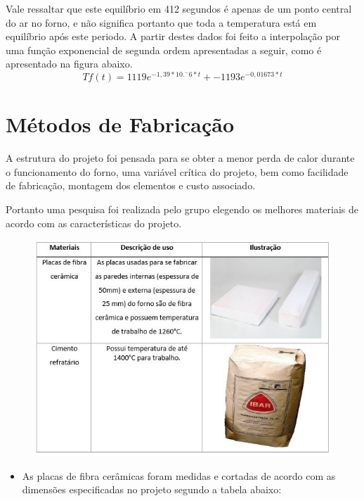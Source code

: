 Vale ressaltar que este equilíbrio em 412 segundos é apenas de um ponto central do ar no
forno, e não significa portanto que toda a temperatura está em equilíbrio após este periodo. A partir
destes dados foi feito a interpolação por uma função exponencial de segunda ordem apresentadas a
seguir, como é apresentado na figura abaixo.
\begin{equation}
Tf(t) = 1119e^{-1,39*10.^- 6*t} + -1193e^{- 0,01673*t}
\end{equation}

\section{Métodos de Fabricação}
A estrutura do projeto foi pensada para se obter a menor perda de calor durante o funcionamento do forno, uma variável crítica do projeto, bem como facilidade de fabricação, montagem dos elementos e custo associado.

Portanto uma pesquisa foi realizada pelo grupo elegendo os melhores materiais de acordo com as características do projeto.

\begin{figure}[ht]
	\centering
	\label{res1}
	\includegraphics[keepaspectratio=true,scale=0.8]{figuras/res1.JPG}
\end{figure}

\begin{itemize}
	\item As placas de fibra cerâmicas foram medidas e cortadas de acordo com as dimensões especificadas no projeto segundo a tabela abaixo:
\end{itemize}

